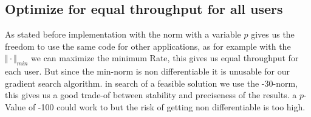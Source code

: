 \subsection{Optimize for equal throughput for all users}
As stated before implementation with the norm with a variable $p$ gives us the freedom to use the same code for other applications, as for example with the $\Vert\cdot\Vert_{min}$ we can maximize the minimum Rate, this gives us equal throughput for each user. But since the min-norm is non differentiable it is unusable for our gradient search algorithm. in search of a feasible solution we use the -30-norm, this gives us a good trade-of between stability and preciseness of the results. a $p$-Value of -100 could work to but the risk of getting non differentiable is too high.